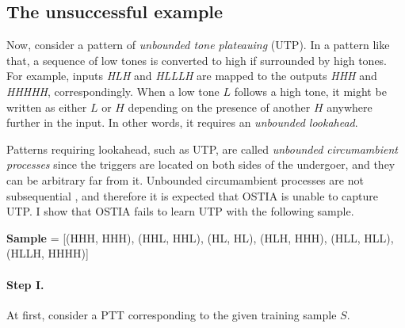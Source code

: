 \subsection{The unsuccessful example}
\label{exam2}

Now, consider a pattern of \emph{unbounded tone plateauing} (UTP).
In a pattern like that, a sequence of low tones is converted to high if surrounded by high tones.
For example, inputs \emph{HLH} and \emph{HLLLH} are mapped to the outputs \emph{HHH} and \emph{HHHHH}, correspondingly.
When a low tone $L$ follows a high tone, it might be written as either $L$ or $H$ depending on the presence of another $H$ anywhere further in the input.
In other words, it requires an \emph{unbounded lookahead}.

Patterns requiring lookahead, such as UTP, are called \emph{unbounded circumambient processes} since the triggers are located on both sides of the undergoer, and they can be arbitrary far from it.
Unbounded circumambient processes are not subsequential \citep{Jardine2016}, and therefore it is expected that OSTIA is unable to capture UTP.
I show that OSTIA fails to learn UTP with the following sample.

\textbf{Sample} = {[}(HHH, HHH), (HHL, HHL), (HL, HL), (HLH, HHH), (HLL, HLL), (HLLH, HHHH){]}

\paragraph{Step I.}
At first, consider a PTT corresponding to the given training sample $S$.

\begin{center}
\end{center}

